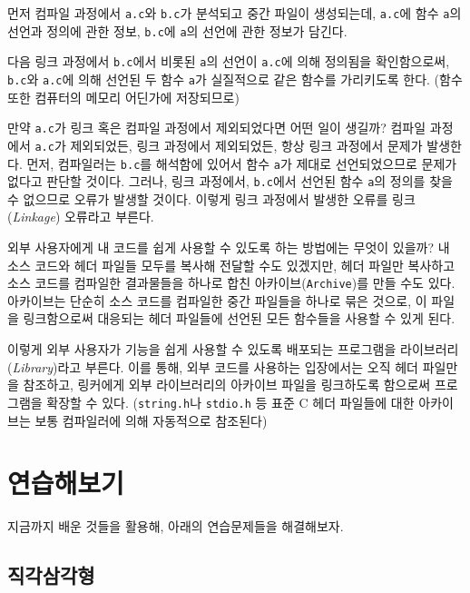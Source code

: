 \documentclass[a4paper,12pt]{book}
\newcommand{\V}[1]{\Verb|#1|}
\begin{document}
        먼저 컴파일 과정에서 \V{a.c}와 \V{b.c}가 분석되고 중간 파일이 생성되는데,
        \V{a.c}에 함수 \V{a}의 선언과 정의에 관한 정보,
        \V{b.c}에 \V{a}의 선언에 관한 정보가 담긴다.

        다음 링크 과정에서 \V{b.c}에서 비롯된 \V{a}의 선언이 \V{a.c}에 의해 정의됨을 확인함으로써,
        \V{b.c}와 \V{a.c}에 의해 선언된 두 함수 \V{a}가 실질적으로 같은 함수를 가리키도록 한다.
        (함수 또한 컴퓨터의 메모리 어딘가에 저장되므로)

        만약 \V{a.c}가 링크 혹은 컴파일 과정에서 제외되었다면 어떤 일이 생길까?
        컴파일 과정에서 \V{a.c}가 제외되었든, 링크 과정에서 제외되었든, 항상 링크 과정에서 문제가 발생한다.
        먼저, 컴파일러는 \V{b.c}를 해석함에 있어서 함수 \V{a}가 제대로 선언되었으므로 문제가 없다고 판단할 것이다.
        그러나, 링크 과정에서, \V{b.c}에서 선언된 함수 \V{a}의 정의를 찾을 수 없으므로 오류가 발생할 것이다.
        이렇게 링크 과정에서 발생한 오류를 링크(\textit{Linkage}) 오류라고 부른다.

        외부 사용자에게 내 코드를 쉽게 사용할 수 있도록 하는 방법에는 무엇이 있을까?
        내 소스 코드와 헤더 파일들 모두를 복사해 전달할 수도 있겠지만,
        헤더 파일만 복사하고 소스 코드를 컴파일한 결과물들을 하나로 합친 아카이브(\V{Archive})를 만들 수도 있다.
        아카이브는 단순히 소스 코드를 컴파일한 중간 파일들을 하나로 묶은 것으로,
        이 파일을 링크함으로써 대응되는 헤더 파일들에 선언된 모든 함수들을 사용할 수 있게 된다.

        이렇게 외부 사용자가 기능을 쉽게 사용할 수 있도록 배포되는 프로그램을 라이브러리(\textit{Library})라고 부른다.
        이를 통해, 외부 코드를 사용하는 입장에서는 오직 헤더 파일만을 참조하고,
        링커에게 외부 라이브러리의 아카이브 파일을 링크하도록 함으로써 프로그램을 확장할 수 있다.
        (\V{string.h}나 \V{stdio.h} 등 표준 C 헤더 파일들에 대한 아카이브는 보통 컴파일러에 의해 자동적으로 참조된다)


\chapter{연습해보기}

지금까지 배운 것들을 활용해, 아래의 연습문제들을 해결해보자.

\section{직각삼각형}
\end{document}
